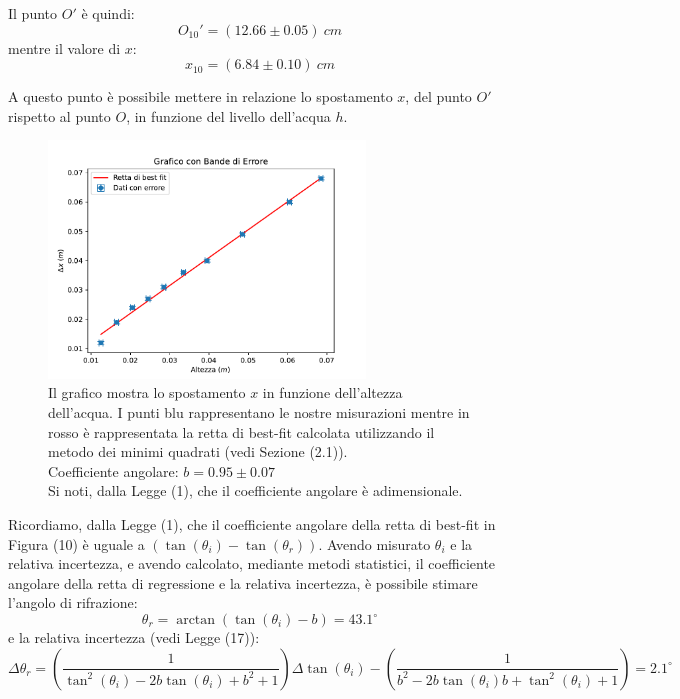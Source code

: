 Il punto $O'$ è quindi:
\begin{equation}
	O_{10}'=(12.66\pm0.05)\ cm
\end{equation}
mentre il valore di $x$:
\begin{equation}
	x_{10}=(6.84\pm 0.10)\ cm
\end{equation}
 
A questo punto è possibile mettere in relazione lo spostamento $x$, del punto $O'$ rispetto al punto $O$, in funzione del livello dell'acqua $h$. 
 
\begin{figure}[H]
	\centering
	\includegraphics[width=0.75\textwidth]{./figures/grafico1}
	\caption{Il grafico mostra lo spostamento $x$ in funzione dell'altezza dell'acqua. I punti blu rappresentano le nostre misurazioni mentre in rosso è rappresentata la retta di best-fit calcolata utilizzando il metodo dei minimi quadrati (vedi Sezione (2.1)).\\
	Coefficiente angolare: $b=0.95\pm 0.07$\\
	Si noti, dalla Legge (1), che il coefficiente angolare è adimensionale.}
\end{figure} 

Ricordiamo, dalla Legge (1), che il coefficiente angolare della retta di best-fit in Figura (10) è uguale a $(\tan(\theta_i)-\tan(\theta_r))$. Avendo misurato $\theta_i$ e la relativa incertezza, e avendo calcolato, mediante metodi statistici, il coefficiente angolare della retta di regressione e la relativa incertezza, è possibile stimare l'angolo di rifrazione:
\begin{equation}
	\theta_r=\arctan(\tan(\theta_i)-b)=43.1^{\circ}
\end{equation}
e la relativa incertezza (vedi Legge (17)):
\begin{equation}
	\Delta \theta_r=\left(\frac{1}{\tan^2(\theta_i)-2b\tan(\theta_i)+b^2+1}\right)\Delta \tan(\theta_i) - \left(\frac{1}{b^2-2b\tan(\theta_i)b+\tan^2(\theta_i)+1}\right)=2.1^{\circ}
\end{equation}



